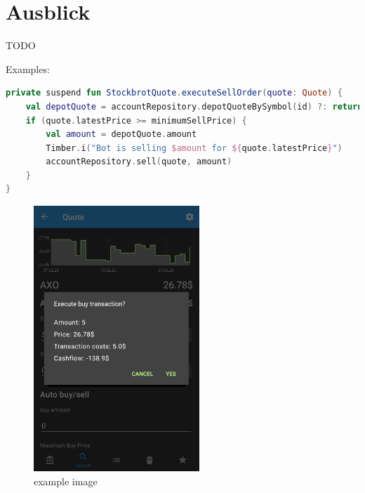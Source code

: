 \documentclass[a4paper]{article}
\begin{document}
\section{Ausblick}
\label{sec:outlook}
TODO


\printbibliography[title={Referenzen}]


\pagebreak
Examples:\\

\begin{lstlisting}[caption={example kotlin code}, captionpos=b, label={lst:example}, language=Kotlin]
private suspend fun StockbrotQuote.executeSellOrder(quote: Quote) {
    val depotQuote = accountRepository.depotQuoteBySymbol(id) ?: return
    if (quote.latestPrice >= minimumSellPrice) {
        val amount = depotQuote.amount
        Timber.i("Bot is selling $amount for ${quote.latestPrice}")
        accountRepository.sell(quote, amount)
    }
}
\end{lstlisting}

\begin{figure}[H]
    \centering
    \includegraphics[height=10cm,keepaspectratio]{./images/quote_buy_confirmation_dialog.png}
    \caption{example image}
    \label{fig:example}
\end{figure}

\pagebreak
\end{document}
